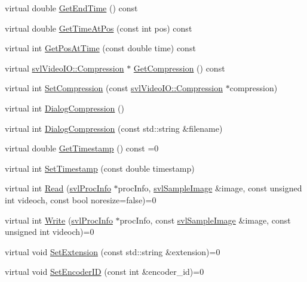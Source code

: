\begin{DoxyCompactItemize}
\item 
virtual double \hyperlink{classsvl_video_codec_base_ae37d3dfad14b32b91142a47aa8d6deb7}{Get\-End\-Time} () const 
\item 
virtual double \hyperlink{classsvl_video_codec_base_a3395c666fc3b62dd08fe58532b0276e3}{Get\-Time\-At\-Pos} (const int pos) const 
\item 
virtual int \hyperlink{classsvl_video_codec_base_aba3f60a59e783830698e665463a37877}{Get\-Pos\-At\-Time} (const double time) const 
\item 
virtual \hyperlink{classsvl_video_i_o_a932d071ec9be4fefde824ab9b9125282}{svl\-Video\-I\-O\-::\-Compression} $\ast$ \hyperlink{classsvl_video_codec_base_a72a3be58ffdd9a51913e82669a17ee1e}{Get\-Compression} () const 
\item 
virtual int \hyperlink{classsvl_video_codec_base_a0359425dc3b7c3c8c3f711d1dba3a7fa}{Set\-Compression} (const \hyperlink{classsvl_video_i_o_a932d071ec9be4fefde824ab9b9125282}{svl\-Video\-I\-O\-::\-Compression} $\ast$compression)
\item 
virtual int \hyperlink{classsvl_video_codec_base_a502611c3f724f1a223d5ef53df5e943e}{Dialog\-Compression} ()
\item 
virtual int \hyperlink{classsvl_video_codec_base_a84975b656e19b551faaa3e897ab81477}{Dialog\-Compression} (const std\-::string \&filename)
\item 
virtual double \hyperlink{classsvl_video_codec_base_a83c414ebdfd4b3357ab13d7250fce399}{Get\-Timestamp} () const =0
\item 
virtual int \hyperlink{classsvl_video_codec_base_ad68fc7c2e3b15c28d115a9035430efa1}{Set\-Timestamp} (const double timestamp)
\item 
virtual int \hyperlink{classsvl_video_codec_base_a5080f4cb4c4e4080c597c08e7b4bea9e}{Read} (\hyperlink{structsvl_proc_info}{svl\-Proc\-Info} $\ast$proc\-Info, \hyperlink{classsvl_sample_image}{svl\-Sample\-Image} \&image, const unsigned int videoch, const bool noresize=false)=0
\item 
virtual int \hyperlink{classsvl_video_codec_base_ad5f3ac2784f190ecd2c41b8ea403d670}{Write} (\hyperlink{structsvl_proc_info}{svl\-Proc\-Info} $\ast$proc\-Info, const \hyperlink{classsvl_sample_image}{svl\-Sample\-Image} \&image, const unsigned int videoch)=0
\item 
virtual void \hyperlink{classsvl_video_codec_base_af44ab8df3791970cdffea982ac18562a}{Set\-Extension} (const std\-::string \&extension)=0
\item 
virtual void \hyperlink{classsvl_video_codec_base_a80937488260c66e7f323798de456381e}{Set\-Encoder\-I\-D} (const int \&encoder\-\_\-id)=0

\end{DoxyCompactItemize}
